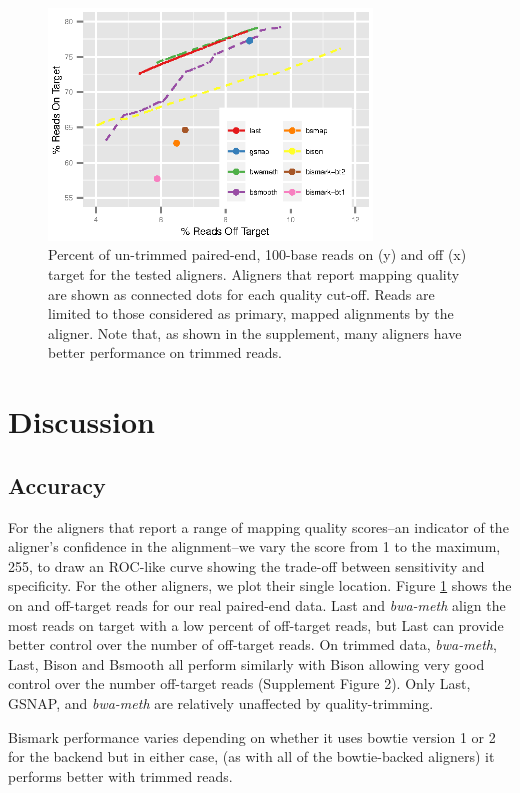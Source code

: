 \documentclass{bioinfo}
\begin{document}
\begin{figure}[!tpb]%
    \centerline{\includegraphics[width=86mm]{real-quals}}
    \caption{Percent of un-trimmed paired-end, 100-base reads on (y) and off (x)
    target for the tested aligners. Aligners that report mapping quality are
shown as connected dots for each quality cut-off. Reads are limited to those
considered as primary, mapped alignments by the aligner. Note that, as shown
in the supplement, many aligners have better performance on trimmed reads.
}\label{fig:01}
\end{figure}

\section{Discussion}

\subsection{Accuracy}
For the aligners that report a range of mapping quality
scores--an indicator of the aligner's confidence in the
alignment--we vary the score from 1 to the maximum, 255, to draw an ROC-like
curve showing the trade-off between sensitivity and specificity. For the
other aligners, we plot their single location. Figure \ref{fig:01} shows
the on and off-target reads for our real paired-end data. Last and 
\textit{bwa-meth} align the most reads on target with a low percent
of off-target reads, but Last can provide better control over the number
of off-target reads. On trimmed data, \textit{bwa-meth}, Last, Bison and
Bsmooth all perform similarly with Bison allowing very good control
over the number off-target reads (Supplement Figure 2).
Only Last, GSNAP, and \textit{bwa-meth} are relatively unaffected by quality-trimming.

Bismark performance varies depending on whether it uses bowtie version
1 or 2 for the backend but in either case, (as with all of the bowtie-backed
aligners) it performs better with trimmed reads.
\end{document}
